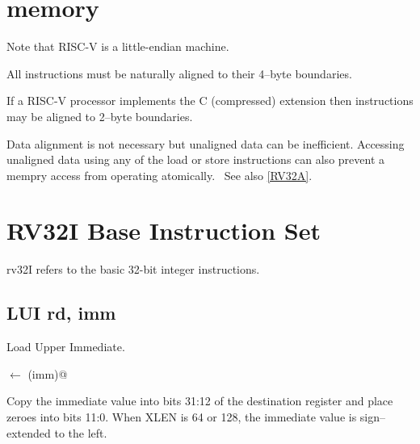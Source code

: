 \section{memory}

Note that RISC-V is a little-endian machine.  

All instructions must be naturally aligned to their 4--byte 
boundaries.~\cite[p.~5]{rvismv1v22:2017}

If a RISC-V processor implements the C (compressed) extension then 
instructions may be aligned to 2--byte 
boundaries.\cite[p.~68]{rvismv1v22:2017}

Data alignment is not necessary but unaligned data can be inefficient.  
Accessing unaligned data using any of the load or store instructions can 
also prevent a mempry access from operating 
atomically.~\cite[p.19]{rvismv1v22:2017}  See also \autoref{RV32A}.



\section{RV32I Base Instruction Set}

\Gls{rv32}I refers to the basic 32-bit integer instructions.

\subsection{LUI rd, imm}

Load Upper Immediate.

\verb@rd@ $\leftarrow$ \verb@zr(imm)@

Copy the immediate value into bits 31:12 of the destination register and
place zeroes into bits 11:0.
When XLEN is 64 or 128, the immediate value is sign--extended to the left.

